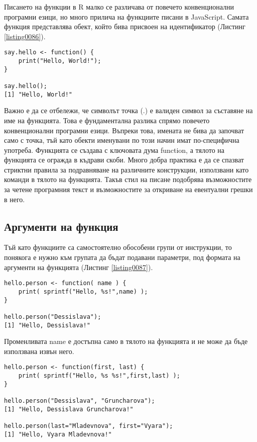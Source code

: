 Писането на функции в R малко се различава от повечето конвенционални програмни езици, но много прилича на функциите писани в JavaScript. Самата функция представлява обект, който бива присвоен на идентификатор (Листинг \ref{listing0086}).

\begin{lstlisting}[caption=Примерна потребителска функция, label=listing0086]
say.hello <- function() {
	print("Hello, World!");
}

say.hello();
[1] "Hello, World!"
\end{lstlisting}

Важно е да се отбележи, че символът точка (.) е валиден символ за съставяне на име на функцията. Това е фундаментална разлика спрямо повечето конвенционални програмни езици. Въпреки това, имената не бива да започват само с точка, тъй като обекти именувани по този начин имат по-специфична употреба. Функцията се създава с ключовата дума function, а тялото на функцията се огражда в къдрави скоби. Много добра практика е да се спазват стриктни правила за подравняване на различните конструкции, използвани като команди в тялото на функцията. Такъв стил на писане подобрява възможностите за четене програмния текст и възможностите за откриване на евентуални грешки в него. 

\subsection{Аргументи на функция}

Тъй като функциите са самостоятелно обособени групи от инструкции, то понякога е нужно към групата да бъдат подавани параметри, под формата на аргументи на функцията (Листинг \ref{listing0087}). 

\begin{lstlisting}[caption=Извикване на функция с аргумент, label=listing0087]
hello.person <- function( name ) {
	print( sprintf("Hello, %s!",name) );
}

hello.person("Dessislava");
[1] "Hello, Dessislava!"
\end{lstlisting}

Променливата name е достъпна само в тялото на функцията и не може да бъде използвана извън него. 

\begin{lstlisting}[caption=Извикване на функция с повече аргументи, label=listing0088]
hello.person <- function(first, last) {
	print( sprintf("Hello, %s %s!",first,last) );
}

hello.person("Dessislava", "Gruncharova");
[1] "Hello, Dessislava Gruncharova!"

hello.person(last="Mladevnova", first="Vyara");
[1] "Hello, Vyara Mladevnova!"
\end{lstlisting}

